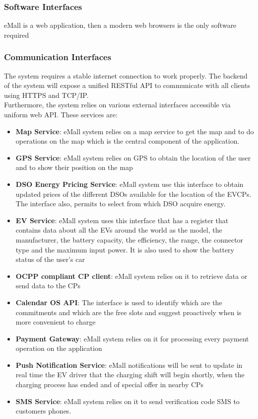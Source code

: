 \subsubsection{Software Interfaces}
eMall is a web application, then a modern web browsers is the only software required

\subsubsection{Communication Interfaces}
The system requires a stable internet connection to work properly.
The backend of the system will expose a unified RESTful API to communicate
with all clients using HTTPS and TCP/IP.
\\Furthermore, the system relies on various external interfaces accessible via uniform web API. These services are:
\begin{itemize}
    \item \textbf{Map Service}: eMall system relies on a map service to get the map and to do operations on the map which is the central component of the application.
    \item \textbf{GPS Service}: eMall system relies on GPS to obtain the location of the user and to show their position on the map
    \item \textbf{DSO Energy Pricing Service}: eMall system use this interface to obtain updated prices of the different DSOs available for the location of the EVCPs. The interface also, permits to select from which DSO acquire energy.
    \item \textbf{EV Service}: eMall system uses this interface that has a register that contains data about all the EVs around the world as the model, the manufacturer, the battery capacity, the efficiency, the range, the connector type and the maximum input power. It is also used to show the battery status of the user's car
    \item \textbf{OCPP compliant CP client}: eMall system relies on it to retrieve data or send data to the CPs
    \item \textbf{Calendar OS API}: The interface is used to identify which are the commitments and which are the free slots and suggest proactively when is more convenient to charge
    \item \textbf{Payment Gateway}: eMall system relies on it for processing every payment operation on the application
    \item \textbf{Push Notification Service}: eMall notifications will be sent to update in real time the EV driver that the charging shift will begin shortly, when the charging process has ended and of special offer in nearby CPs
    \item \textbf{SMS Service}: eMall system relies on it to send verification code SMS to customers phones.
\end{itemize}

